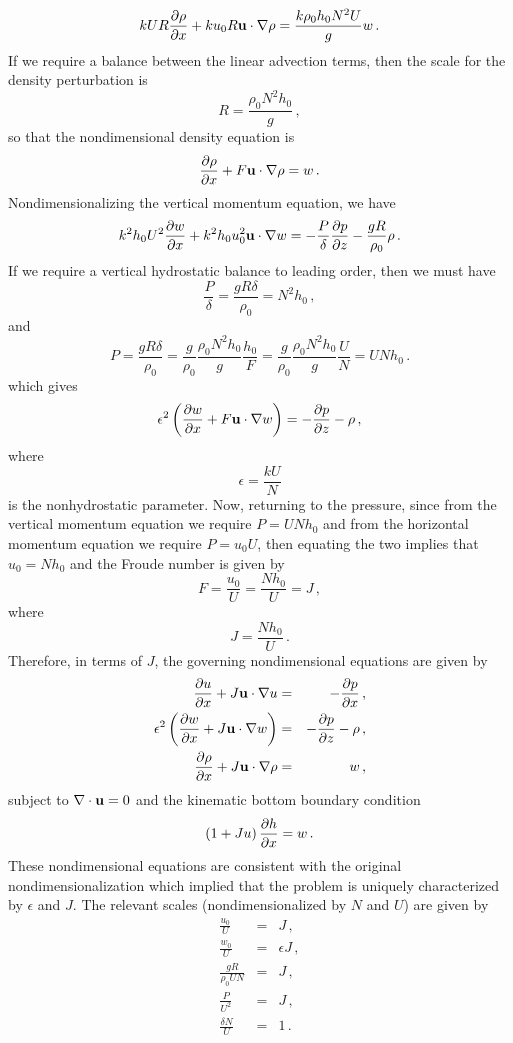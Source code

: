 \documentclass[12pt]{article}
\begin{document}
\[
k U R \frac{\partial{\rho}}{\partial{x}} + k u_0 R \mathbf{u}\cdot\nabla\rho = \frac{k \rho_0 h_0 N^2 U}{g} w\,.
\]
If we require a balance between the linear advection terms, then the scale for the density
perturbation is 
\[
R = \frac{\rho_0 N^2 h_0}{g}\,,
\]
so that the nondimensional density equation is
\[
\frac{\partial{\rho}}{\partial{x}} + F \mathbf{u}\cdot\nabla\rho = w\,.
\]
Nondimensionalizing the vertical momentum equation, we have
\[
k^2 h_0 U^2 \frac{\partial{w}}{\partial{x}} + k^2 h_0 u_0^2\mathbf{u}\cdot\nabla w = -\frac{P}{\delta}\frac{\partial{p}}{\partial{z}} - \frac{g R}{\rho_0} \rho\,.
\]
If we require a vertical hydrostatic balance to leading order, then we must have 
\[
\frac{P}{\delta} = \frac{g R \delta}{\rho_0} 
  = N^2 h_0\,,
\]
and
\[
P = \frac{g R \delta}{\rho_0} 
  = \frac{g}{\rho_0} \frac{\rho_0 N^2 h_0}{g} \frac{h_0}{F}
  = \frac{g}{\rho_0} \frac{\rho_0 N^2 h_0}{g} \frac{U}{N}
  = U N h_0\,.
\]
which gives
\[
\epsilon^2 \left(\frac{\partial{w}}{\partial{x}} + F\mathbf{u}\cdot\nabla w\right) = -\frac{\partial{p}}{\partial{z}} - \rho\,,
\]
where 
\[
\epsilon = \frac{k U}{N}
\]
is the nonhydrostatic parameter. Now, returning to the pressure, since from the vertical momentum equation we
require $P = U N h_0$ and from the horizontal momentum equation we require $P = u_0 U$, then equating the
two implies that $u_0 = N h_0$ and the Froude number is given by
\[
F = \frac{u_0}{U} = \frac{N h_0}{U} = J\,,
\]
where
\[
J = \frac{N h_0}{U}\,.
\]
Therefore, in terms of $J$, the governing nondimensional equations are given by
\begin{eqnarray*}
\frac{\partial{u}}{\partial{x}} + J\mathbf{u}\cdot\nabla u &=& -\frac{\partial{p}}{\partial{x}}\,,\\
\epsilon^2 \left(\frac{\partial{w}}{\partial{x}} + J\mathbf{u}\cdot\nabla w\right) &=& -\frac{\partial{p}}{\partial{z}} - \rho\,,\\
\frac{\partial{\rho}}{\partial{x}} + J \mathbf{u}\cdot\nabla\rho &=& w\,,
\end{eqnarray*}
subject to $\nabla\cdot\mathbf{u}=0$ and the kinematic bottom boundary condition
\[
\left(1 + J u\right)\frac{\partial{h}}{\partial{x}} = w\,.
\]
These nondimensional equations are consistent with the original nondimensionalization which implied
that the problem is uniquely characterized by $\epsilon$ and $J$.
The relevant scales (nondimensionalized by $N$ and $U$) are given by
\begin{eqnarray*}
\frac{u_0}{U} &=& J\,,\\
\frac{w_0}{U} &=& \epsilon J\,,\\
\frac{gR}{\rho_0 U N} &=& J\,,\\
\frac{P}{U^2} &=& J\,,\\
\frac{\delta N}{U} &=& 1\,.
\end{eqnarray*}
\end{document}
